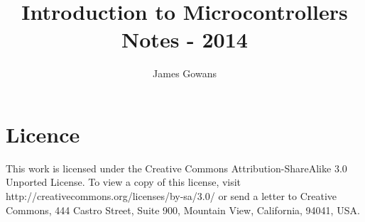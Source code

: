 \documentclass[twoside]{scrartcl}
\title{Introduction to Microcontrollers Notes - 2014}
\author{James Gowans}
\begin{document}
\maketitle
\section*{Licence}
This work is licensed under the Creative Commons Attribution-ShareAlike 3.0 Unported License. To view a copy of this license, visit http://creativecommons.org/licenses/by-sa/3.0/ or send a letter to Creative Commons, 444 Castro Street, Suite 900, Mountain View, California, 94041, USA.

\newpage

\end{document}
